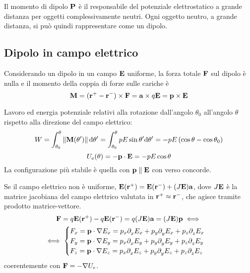 Il momento di dipolo $\mathbf{P}$ è il responsabile del potenziale elettrostatico a grande distanza per oggetti complessivamente neutri.
Ogni oggetto neutro, a grande distanza, si può quindi rappresentare come un dipolo.


\subsection{Dipolo in campo elettrico}

Considerando un dipolo in un campo $\mathbf{E}$ uniforme, la forza totale $\mathbf{F}$ sul dipolo è nulla e il momento della coppia di forze sulle cariche è
\begin{equation}
    \mathbf{M} = (\mathbf{r}^+ - \mathbf{r}^-) \times \mathbf{F}
    = \mathbf{a} \times q \mathbf{E}
    = \mathbf{p} \times \mathbf{E}
\end{equation}

Lavoro ed energia potenziale relativi alla rotazione dall'angolo $\theta_0$ all'angolo $\theta$ rispetto alla direzione del campo elettrico:
\begin{equation}
    W = \int_{\theta_0}^\theta \left\lVert \mathbf{M}(\theta') \right\rVert \mathrm{d} \theta'
    = \int_{\theta_0}^\theta p E \sin\theta' \mathrm{d} \theta'
    = - pE \left( \cos\theta - \cos\theta_0 \right)
\end{equation}
\begin{equation}
    U_e(\theta) = - \mathbf{p} \cdot \mathbf{E} = - p E \cos\theta
\end{equation}
La configurazione più stabile è quella con $\mathbf{p} \parallel \mathbf{E}$ con verso concorde.

Se il campo elettrico non è uniforme, $\mathbf{E}(\mathbf{r}^+) = \mathbf{E}(\mathbf{r}^-) + (J \mathbf{E}) \mathbf{a}$, dove $J \mathbf{E}$ è la matrice jacobiana del campo elettrico valutata in $\mathbf{r}^+ \approx \mathbf{r}^-$, che agisce tramite prodotto matrice-vettore.
\begin{gather}
    \force = q \vt{E}(\p^+) - q \vt{E}(\p^-) = q (J \E) \vt{a} = (J \E) \vt{p} \iff \\
    \iff \begin{cases}
        F_x = \vt{p} \cdot \grad E_x = p_x \parder[E_x]{x} + p_y \parder[E_x]{y} + p_z \parder[E_x]{z} \\
        F_y = \vt{p} \cdot \grad E_y = p_x \parder[E_y]{x} + p_y \parder[E_y]{y} + p_z \parder[E_y]{z} \\
        F_z = \vt{p} \cdot \grad E_z = p_x \parder[E_z]{x} + p_y \parder[E_z]{y} + p_z \parder[E_z]{z}
    \end{cases}
\end{gather}
coerentemente con $\mathbf{F} = - \nabla U_e$.


